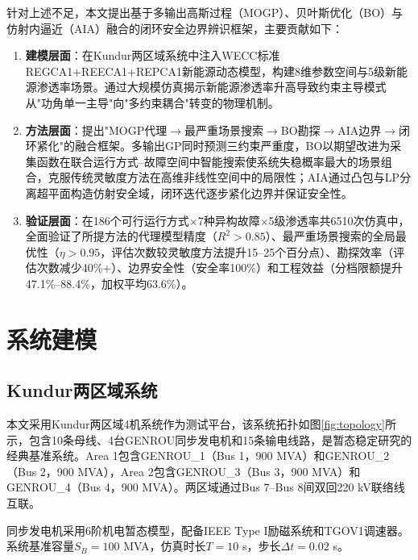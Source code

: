 \documentclass[a4paper,11pt]{ctexart}
\begin{document}
针对上述不足，本文提出基于多输出高斯过程（MOGP）、贝叶斯优化（BO）与仿射内逼近（AIA）融合的闭环安全边界辨识框架，主要贡献如下：

\begin{enumerate}
    \item \textbf{建模层面}：在Kundur两区域系统中注入WECC标准REGCA1+REECA1+REPCA1新能源动态模型，构建8维参数空间与5级新能源渗透率场景。通过大规模仿真揭示新能源渗透率升高导致约束主导模式从"功角单一主导"向"多约束耦合"转变的物理机制。

    \item \textbf{方法层面}：提出"MOGP代理$\to$最严重场景搜索$\to$BO勘探$\to$AIA边界$\to$闭环紧化"的融合框架。多输出GP同时预测三约束严重度，BO以期望改进为采集函数在联合运行方式--故障空间中智能搜索使系统失稳概率最大的场景组合，克服传统灵敏度方法在高维非线性空间中的局限性；AIA通过凸包与LP分离超平面构造仿射安全域，闭环迭代逐步紧化边界并保证安全性。

    \item \textbf{验证层面}：在186个可行运行方式$\times$7种异构故障$\times$5级渗透率共6510次仿真中，全面验证了所提方法的代理模型精度（$R^2 > 0.85$）、最严重场景搜索的全局最优性（$\eta > 0.95$，评估次数较灵敏度方法提升15--25个百分点）、勘探效率（评估次数减少40\%+）、边界安全性（安全率100\%）和工程效益（分档限额提升47.1\%--88.4\%，加权平均63.6\%）。
\end{enumerate}

\section{系统建模}
\label{sec:modeling}

\subsection{Kundur两区域系统}

本文采用Kundur两区域4机系统作为测试平台，该系统拓扑如图\ref{fig:topology}所示，包含10条母线、4台GENROU同步发电机和15条输电线路，是暂态稳定研究的经典基准系统\cite{kundur1994power}。Area 1包含GENROU\_1（Bus 1，900 MVA）和GENROU\_2（Bus 2，900 MVA），Area 2包含GENROU\_3（Bus 3，900 MVA）和GENROU\_4（Bus 4，900 MVA）。两区域通过Bus 7--Bus 8间双回220 kV联络线互联。

同步发电机采用6阶机电暂态模型，配备IEEE Type I励磁系统和TGOV1调速器。系统基准容量$S_B = 100$ MVA，仿真时长$T = 10$ s，步长$\Delta t = 0.02$ s。
\end{document}
